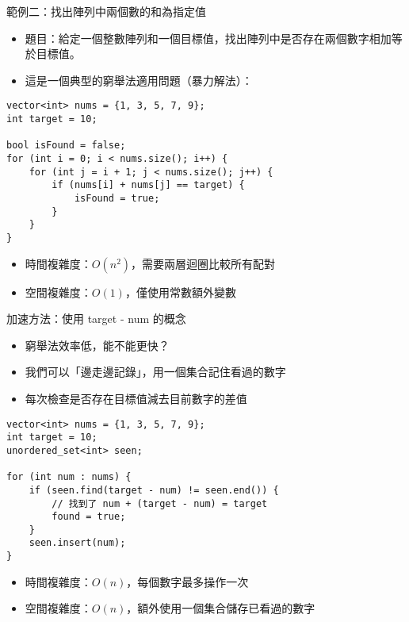 \documentclass{beamer}
\begin{document}
\begin{frame}[fragile]{範例二：找出陣列中兩個數的和為指定值}
\begin{itemize}
    \item 題目：給定一個整數陣列和一個目標值，找出陣列中是否存在兩個數字相加等於目標值。
    \item 這是一個典型的窮舉法適用問題（暴力解法）：
\end{itemize}

\vspace{0.5em}
\begin{lstlisting}[style=cppstyle]
vector<int> nums = {1, 3, 5, 7, 9};
int target = 10;

bool isFound = false;
for (int i = 0; i < nums.size(); i++) {
    for (int j = i + 1; j < nums.size(); j++) {
        if (nums[i] + nums[j] == target) {
            isFound = true;
        }
    }
}
\end{lstlisting}

\vspace{0.5em}
\begin{itemize}
    \item 時間複雜度：$O(n^2)$，需要兩層迴圈比較所有配對
    \item 空間複雜度：$O(1)$，僅使用常數額外變數
\end{itemize}
\end{frame}

\begin{frame}[fragile]{加速方法：使用 target - num 的概念}
\begin{itemize}
    \item 窮舉法效率低，能不能更快？
    \item 我們可以「邊走邊記錄」，用一個集合記住看過的數字
    \item 每次檢查是否存在目標值減去目前數字的差值
\end{itemize}

\vspace{0.5em}
\begin{lstlisting}[style=cppstyle]
vector<int> nums = {1, 3, 5, 7, 9};
int target = 10;
unordered_set<int> seen;

for (int num : nums) {
    if (seen.find(target - num) != seen.end()) {
        // 找到了 num + (target - num) = target
        found = true;
    }
    seen.insert(num);
}
\end{lstlisting}

\vspace{0.5em}
\begin{itemize}
    \item 時間複雜度：$O(n)$，每個數字最多操作一次
    \item 空間複雜度：$O(n)$，額外使用一個集合儲存已看過的數字
\end{itemize}
\end{frame}
\end{document}

